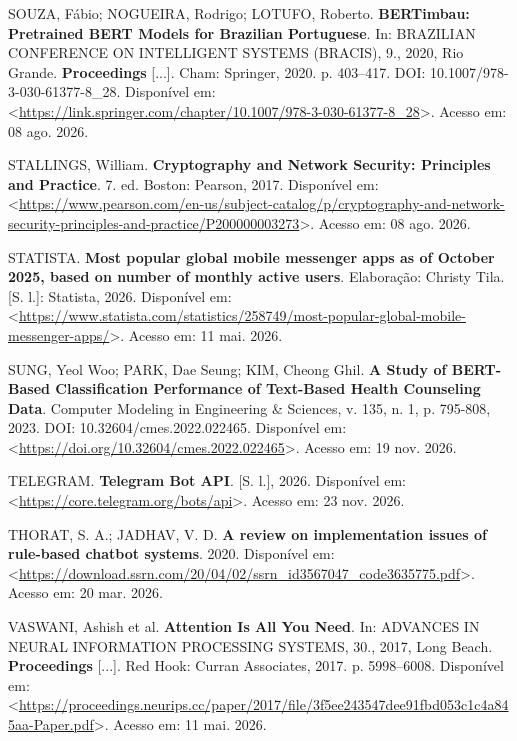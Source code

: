 \documentclass[12pt,a4paper]{extarticle}
\begin{document}
\vspace{0.5cm}\noindent
SOUZA, Fábio; NOGUEIRA, Rodrigo; LOTUFO, Roberto. \textbf{BERTimbau: Pretrained BERT Models for Brazilian Portuguese}. In: BRAZILIAN CONFERENCE ON INTELLIGENT SYSTEMS (BRACIS), 9., 2020, Rio Grande. \textbf{Proceedings} [...]. Cham: Springer, 2020. p. 403--417. DOI: 10.1007/978-3-030-61377-8\_28. Disponível em: <\url{https://link.springer.com/chapter/10.1007/978-3-030-61377-8_28}>. Acesso em: 08 ago. 2026.

\vspace{0.5cm}\noindent
STALLINGS, William. \textbf{Cryptography and Network Security: Principles and Practice}. 7. ed. Boston: Pearson, 2017. Disponível em: <\url{https://www.pearson.com/en-us/subject-catalog/p/cryptography-and-network-security-principles-and-practice/P200000003273}>. Acesso em: 08 ago. 2026.

\vspace{0.5cm}\noindent
STATISTA. \textbf{Most popular global mobile messenger apps as of October 2025, based on number of monthly active users}. Elaboração: Christy Tila. [S. l.]: Statista, 2026. Disponível em: <\url{https://www.statista.com/statistics/258749/most-popular-global-mobile-messenger-apps/}>. Acesso em: 11 mai. 2026.

\vspace{0.5cm}\noindent
SUNG, Yeol Woo; PARK, Dae Seung; KIM, Cheong Ghil. \textbf{A Study of BERT-Based Classification Performance of Text-Based Health Counseling Data}. Computer Modeling in Engineering \& Sciences, v. 135, n. 1, p. 795-808, 2023. DOI: 10.32604/cmes.2022.022465. Disponível em: <\url{https://doi.org/10.32604/cmes.2022.022465}>. Acesso em: 19 nov. 2026.

\vspace{0.5cm}\noindent
TELEGRAM. \textbf{Telegram Bot API}. [S. l.], 2026. Disponível em: <\url{https://core.telegram.org/bots/api}>. Acesso em: 23 nov. 2026.

\vspace{0.5cm}\noindent
THORAT, S. A.; JADHAV, V. D. \textbf{A review on implementation issues of rule-based chatbot systems}. 2020. Disponível em: <\url{https://download.ssrn.com/20/04/02/ssrn_id3567047_code3635775.pdf}>. Acesso em: 20 mar. 2026.

\vspace{0.5cm}\noindent
VASWANI, Ashish et al. \textbf{Attention Is All You Need}. In: ADVANCES IN NEURAL INFORMATION PROCESSING SYSTEMS, 30., 2017, Long Beach. \textbf{Proceedings} [...]. Red Hook: Curran Associates, 2017. p. 5998--6008. Disponível em: <\url{https://proceedings.neurips.cc/paper/2017/file/3f5ee243547dee91fbd053c1c4a845aa-Paper.pdf}>. Acesso em: 11 mai. 2026.
\end{document}
